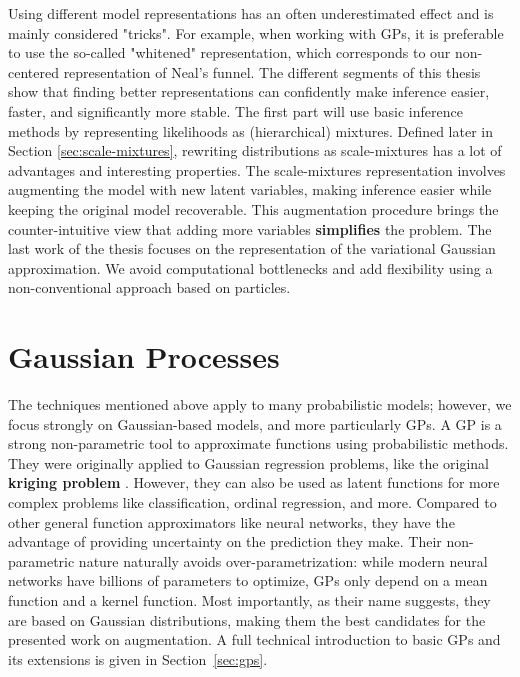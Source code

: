 Using different model representations has an often underestimated effect and is mainly considered "tricks".
For example, when working with \acf{GPs}, it is preferable to use the so-called "whitened" representation, which corresponds to our non-centered representation of Neal's funnel.
The different segments of this thesis show that finding better representations can confidently make inference easier, faster, and significantly more stable. 
The first part will use basic inference methods by representing likelihoods as (hierarchical) mixtures.
Defined later in Section \ref{sec:scale-mixtures}, rewriting distributions as scale-mixtures has a lot of advantages and interesting properties.
The scale-mixtures representation involves augmenting the model with new latent variables, making inference easier while keeping the original model recoverable.
This augmentation procedure brings the counter-intuitive view that adding more variables \textbf{simplifies} the problem.
The last work of the thesis focuses on the representation of the variational Gaussian approximation.
We avoid computational bottlenecks and add flexibility using a non-conventional approach based on particles.

\section{Gaussian Processes}

The techniques mentioned above apply to many probabilistic models; however, we focus strongly on Gaussian-based models, and more particularly \acf{GPs}.
A \ac{GP} is a strong non-parametric tool to approximate functions using probabilistic methods.
They were originally applied to Gaussian regression problems, like the original \textbf{kriging problem} \cite{cressie1990origins}. However, they can also be used as latent functions for more complex problems like classification, ordinal regression, and more.
Compared to other general function approximators like neural networks, they have the advantage of providing uncertainty on the prediction they make.
Their non-parametric nature naturally avoids over-parametrization: while modern neural networks have billions of parameters to optimize, \ac{GPs} only depend on a mean function and a kernel function.
Most importantly, as their name suggests, they are based on Gaussian distributions, making them the best candidates for the presented work on augmentation.
A full technical introduction to basic \ac{GPs} and its extensions is given in Section~\ref{sec:gps}.

